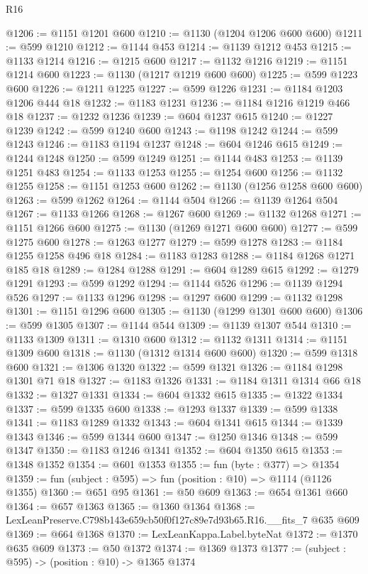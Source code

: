 \begin{lexlean}{R16}
\begin{coremodule}
@1206 := @1151 @1201 @600
@1210 := @1130 (@1204 @1206 @600 @600)
@1211 := @599 @1210
@1212 := @1144 @453
@1214 := @1139 @1212 @453
@1215 := @1133 @1214
@1216 := @1215 @600
@1217 := @1132 @1216
@1219 := @1151 @1214 @600
@1223 := @1130 (@1217 @1219 @600 @600)
@1225 := @599 @1223 @600
@1226 := @1211 @1225
@1227 := @599 @1226
@1231 := @1184 @1203 @1206 @444 @18
@1232 := @1183 @1231
@1236 := @1184 @1216 @1219 @466 @18
@1237 := @1232 @1236
@1239 := @604 @1237 @615
@1240 := @1227 @1239
@1242 := @599 @1240 @600
@1243 := @1198 @1242
@1244 := @599 @1243
@1246 := @1183 @1194 @1237
@1248 := @604 @1246 @615
@1249 := @1244 @1248
@1250 := @599 @1249
@1251 := @1144 @483
@1253 := @1139 @1251 @483
@1254 := @1133 @1253
@1255 := @1254 @600
@1256 := @1132 @1255
@1258 := @1151 @1253 @600
@1262 := @1130 (@1256 @1258 @600 @600)
@1263 := @599 @1262
@1264 := @1144 @504
@1266 := @1139 @1264 @504
@1267 := @1133 @1266
@1268 := @1267 @600
@1269 := @1132 @1268
@1271 := @1151 @1266 @600
@1275 := @1130 (@1269 @1271 @600 @600)
@1277 := @599 @1275 @600
@1278 := @1263 @1277
@1279 := @599 @1278
@1283 := @1184 @1255 @1258 @496 @18
@1284 := @1183 @1283
@1288 := @1184 @1268 @1271 @185 @18
@1289 := @1284 @1288
@1291 := @604 @1289 @615
@1292 := @1279 @1291
@1293 := @599 @1292
@1294 := @1144 @526
@1296 := @1139 @1294 @526
@1297 := @1133 @1296
@1298 := @1297 @600
@1299 := @1132 @1298
@1301 := @1151 @1296 @600
@1305 := @1130 (@1299 @1301 @600 @600)
@1306 := @599 @1305
@1307 := @1144 @544
@1309 := @1139 @1307 @544
@1310 := @1133 @1309
@1311 := @1310 @600
@1312 := @1132 @1311
@1314 := @1151 @1309 @600
@1318 := @1130 (@1312 @1314 @600 @600)
@1320 := @599 @1318 @600
@1321 := @1306 @1320
@1322 := @599 @1321
@1326 := @1184 @1298 @1301 @71 @18
@1327 := @1183 @1326
@1331 := @1184 @1311 @1314 @66 @18
@1332 := @1327 @1331
@1334 := @604 @1332 @615
@1335 := @1322 @1334
@1337 := @599 @1335 @600
@1338 := @1293 @1337
@1339 := @599 @1338
@1341 := @1183 @1289 @1332
@1343 := @604 @1341 @615
@1344 := @1339 @1343
@1346 := @599 @1344 @600
@1347 := @1250 @1346
@1348 := @599 @1347
@1350 := @1183 @1246 @1341
@1352 := @604 @1350 @615
@1353 := @1348 @1352
@1354 := @601 @1353
@1355 := fun (byte : @377) => @1354
@1359 := fun (subject : @595) => fun (position : @10) => @1114 (@1126 @1355)
@1360 := @651 @95
@1361 := @50 @609
@1363 := @654 @1361 @660
@1364 := @657 @1363
@1365 := @1360 @1364
@1368 := LexLeanPreserve.C798b143e659cb50f0f127c89e7d93b65.R16.__fits_7 @635 @609
@1369 := @664 @1368
@1370 := LexLeanKappa.Label.byteNat
@1372 := @1370 @635 @609
@1373 := @50 @1372
@1374 := @1369 @1373
@1377 := (subject : @595) -> (position : @10) -> @1365 @1374

\end{coremodule}
\end{lexlean}
